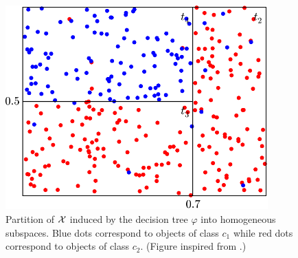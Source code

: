 \begin{figure}
    \centering
    \includegraphics[width=0.9\textwidth]{figures/ch3_partition.pdf}
    \caption{Partition of ${\cal X}$ induced by the decision tree $\varphi$ into homogeneous subspaces.
             Blue dots correspond to objects of class $c_1$ while red dots correspond
             to objects of class $c_2$. (Figure inspired from \citet{breiman:1984}.)}
    \label{fig:3:partition}
\end{figure}

